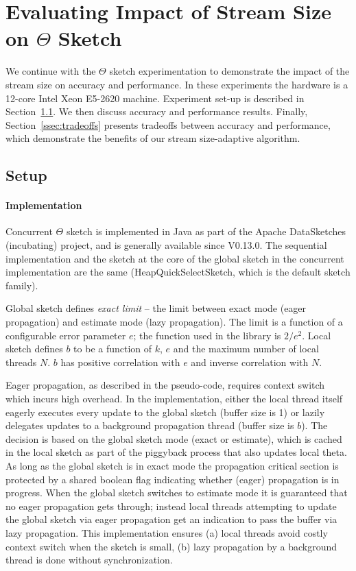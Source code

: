 \section{Evaluating Impact of Stream Size on $\Theta$ Sketch}
\label{sec:eval}
We continue with the $\Theta$ sketch experimentation to demonstrate the impact of the stream size on accuracy and performance. 
In these experiments the hardware is a 12-core Intel Xeon E5-2620 machine.
Experiment set-up is described in Section~\ref{ssec:setup}. We then discuss accuracy and performance results. Finally, Section~\ref{ssec:tradeoffs} presents tradeoffs between accuracy and performance, which demonstrate the benefits of our stream size-adaptive algorithm.

\subsection{Setup}
\label{ssec:setup}
\paragraph{Implementation}
Concurrent $\Theta$ sketch is implemented in Java as part of the Apache DataSketches (incubating) project, and is generally available since V0.13.0. 
The sequential implementation and the sketch at the core of the global sketch in the concurrent implementation are the same (HeapQuickSelectSketch, which is the default sketch family).

Global sketch defines \emph{exact limit} -- the limit between exact mode (eager propagation) and estimate mode (lazy propagation). The limit is a function of a configurable error parameter $e$; the function used in the library is $2/e^2$. 
%
Local sketch defines $b$ to be a function of $k$, $e$ and the maximum number of local threads $N$. $b$ has positive correlation with $e$ and inverse correlation with $N$.

Eager propagation, as described in the pseudo-code, requires context switch which incurs high overhead. In the implementation, either the local thread itself eagerly executes every update to the global sketch (buffer size is 1) or lazily delegates updates to a background propagation thread (buffer size is $b$). The decision is based on the global sketch mode (exact or estimate), which is cached in the local sketch as part of the piggyback process that also updates local theta. 
As long as the global sketch is in exact mode the propagation critical section is protected by a shared boolean flag indicating whether (eager) propagation is in progress. When the global sketch switches to estimate mode it is guaranteed that no eager propagation gets through; instead local threads attempting to update the global sketch via eager propagation get an indication to pass the buffer via lazy propagation.
This implementation ensures (a) local threads avoid costly context switch when the sketch is small, (b) lazy propagation by a background thread is done without synchronization.

